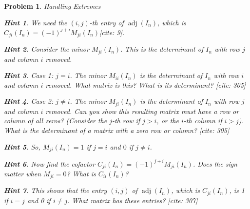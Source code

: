 \documentclass[12pt]{article}
\newtheorem{problem}{Problem}[section]
\theoremstyle{definition}
\newtheorem{hint}{Hint}[question]
\newcommand{\adj}{\operatorname{adj}}
\begin{document}
\begin{problem}{Handling Extremes}
        \begin{hint}
            We need the $(i, j)$-th entry of $\adj(I_n)$, which is $C_{ji}(I_n) = (-1)^{j+i} M_{ji}(I_n)$[cite: 9].
        \end{hint}
         \begin{hint}
             Consider the minor $M_{ji}(I_n)$. This is the determinant of $I_n$ with row $j$ and column $i$ removed.
         \end{hint}
         \begin{hint}
             Case 1: $j=i$. The minor $M_{ii}(I_n)$ is the determinant of $I_n$ with row $i$ and column $i$ removed. What matrix is this? What is its determinant? [cite: 305]
         \end{hint}
         \begin{hint}
             Case 2: $j \neq i$. The minor $M_{ji}(I_n)$ is the determinant of $I_n$ with row $j$ and column $i$ removed. Can you show this resulting matrix must have a row or column of all zeros? (Consider the $j$-th row if $j>i$, or the $i$-th column if $i>j$). What is the determinant of a matrix with a zero row or column? [cite: 305]
         \end{hint}
         \begin{hint}
             So, $M_{ji}(I_n) = 1$ if $j=i$ and $0$ if $j \neq i$.
         \end{hint}
         \begin{hint}
             Now find the cofactor $C_{ji}(I_n) = (-1)^{j+i} M_{ji}(I_n)$. Does the sign matter when $M_{ji}=0$? What is $C_{ii}(I_n)$?
         \end{hint}
         \begin{hint}
             This shows that the entry $(i, j)$ of $\adj(I_n)$, which is $C_{ji}(I_n)$, is 1 if $i=j$ and 0 if $i \neq j$. What matrix has these entries? [cite: 307]
         \end{hint}
    
\end{problem}
\end{document}
